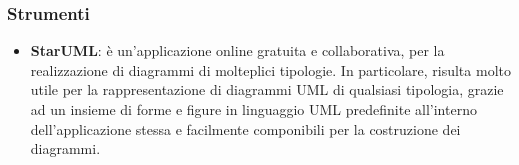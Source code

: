 		\subsubsection{Strumenti}
			\begin{itemize}
				\item\textbf{StarUML}: è un'applicazione online gratuita e collaborativa, per la realizzazione di diagrammi di molteplici tipologie. In particolare, risulta molto utile per la rappresentazione di diagrammi UML di qualsiasi tipologia, grazie ad un insieme di forme e figure in linguaggio UML predefinite all'interno dell'applicazione stessa e facilmente componibili per la costruzione dei diagrammi.
			\end{itemize}
			
			
			
			
			
			
			
			
			
			
			
			
			
			
			
\newpage		
				